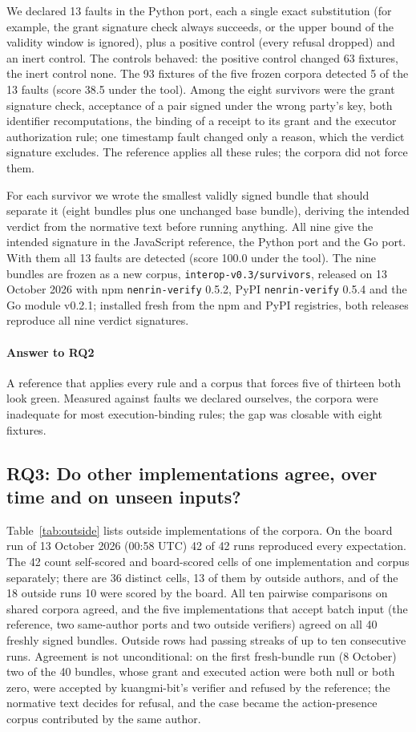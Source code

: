 \documentclass[preprint,12pt,authoryear]{elsarticle}
\newcommand{\code}[1]{\texttt{#1}}
\begin{document}
We declared 13 faults in the Python port, each a single exact substitution (for example, the grant signature check always succeeds, or the upper bound of the validity window is ignored), plus a positive control (every refusal dropped) and an inert control. The controls behaved: the positive control changed 63 fixtures, the inert control none. The 93 fixtures of the five frozen corpora detected 5 of the 13 faults (score 38.5 under the tool). Among the eight survivors were the grant signature check, acceptance of a pair signed under the wrong party's key, both identifier recomputations, the binding of a receipt to its grant and the executor authorization rule; one timestamp fault changed only a reason, which the verdict signature excludes. The reference applies all these rules; the corpora did not force them.

For each survivor we wrote the smallest validly signed bundle that should separate it (eight bundles plus one unchanged base bundle), deriving the intended verdict from the normative text before running anything. All nine give the intended signature in the JavaScript reference, the Python port and the Go port. With them all 13 faults are detected (score 100.0 under the tool). The nine bundles are frozen as a new corpus, \code{interop-v0.3/survivors}, released on 13 October 2026 with npm \code{nenrin-verify} 0.5.2, PyPI \code{nenrin-verify} 0.5.4 and the Go module v0.2.1; installed fresh from the npm and PyPI registries, both releases reproduce all nine verdict signatures.

\paragraph{Answer to RQ2} A reference that applies every rule and a corpus that forces five of thirteen both look green. Measured against faults we declared ourselves, the corpora were inadequate for most execution-binding rules; the gap was closable with eight fixtures.

\subsection{RQ3: Do other implementations agree, over time and on unseen inputs?}\label{sec:rq3}

Table~\ref{tab:outside} lists outside implementations of the corpora. On the board run of 13 October 2026 (00:58 UTC) 42 of 42 runs reproduced every expectation. The 42 count self-scored and board-scored cells of one implementation and corpus separately; there are 36 distinct cells, 13 of them by outside authors, and of the 18 outside runs 10 were scored by the board. All ten pairwise comparisons on shared corpora agreed, and the five implementations that accept batch input (the reference, two same-author ports and two outside verifiers) agreed on all 40 freshly signed bundles. Outside rows had passing streaks of up to ten consecutive runs. Agreement is not unconditional: on the first fresh-bundle run (8 October) two of the 40 bundles, whose grant and executed action were both null or both zero, were accepted by kuangmi-bit's verifier and refused by the reference; the normative text decides for refusal, and the case became the action-presence corpus contributed by the same author.
\end{document}
